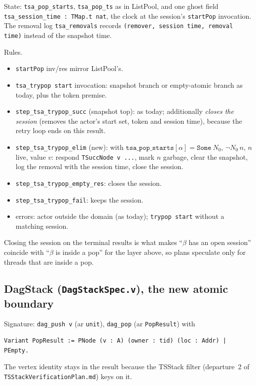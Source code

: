 \documentclass[11pt]{article}
\theoremstyle{definition}
\theoremstyle{remark}
\newcommand{\code}[1]{\texttt{#1}}
\newcommand{\file}[1]{\texttt{#1}}
\begin{document}
State: \code{tsa\_pop\_starts}, \code{tsa\_pop\_ts} as in ListPool, and
one ghost field \code{tsa\_session\_time : TMap.t nat}, the clock at the
session's \code{startPop} invocation. The removal log
\code{tsa\_removals} records \code{(remover, session time, removal time)}
instead of the snapshot time.

Rules.

\begin{itemize}[nosep]
\item \code{startPop} inv/res mirror ListPool's.
\item \code{tsa\_trypop start} invocation: snapshot branch or empty-atomic
  branch as today, plus the token premise.
\item \code{step\_tsa\_trypop\_succ} (snapshot top): as today; additionally
  \emph{closes the session} (removes the actor's start set, token and
  session time), because the retry loop ends on this result.
\item \code{step\_tsa\_trypop\_elim} (new): with
  $\code{tsa\_pop\_starts}[\alpha] = \code{Some}\ N_0$, $\neg N_0\,n$,
  $n$ live, value $v$: respond \code{TSuccNode v ...}, mark $n$ garbage,
  clear the snapshot, log the removal with the session time, close the
  session.
\item \code{step\_tsa\_trypop\_empty\_res}: closes the session.
\item \code{step\_tsa\_trypop\_fail}: keeps the session.
\item errors: actor outside the domain (as today); \code{trypop start}
  without a matching session.
\end{itemize}

Closing the session on the terminal results is what makes ``$\beta$ has an
open session'' coincide with ``$\beta$ is inside a pop'' for the layer
above, so plans speculate only for threads that are inside a pop.

\subsection{DagStack (\file{DagStackSpec.v}), the new atomic boundary}

Signature: \code{dag\_push v} (ar \code{unit}), \code{dag\_pop}
(ar \code{PopResult}) with
\begin{lstlisting}
Variant PopResult := PNode (v : A) (owner : tid) (loc : Addr) | PEmpty.
\end{lstlisting}
The vertex identity stays in the result because the TSStack filter
(departure~2 of \file{TSStackVerificationPlan.md}) keys on it.
\end{document}
